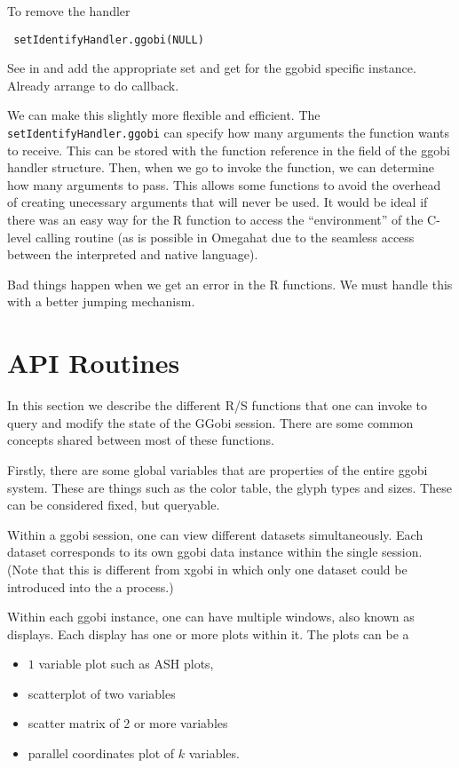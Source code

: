 \documentclass{article}
\def\SFunction#1{{\texttt{\red #1}}}
\begin{document}
To remove the handler
\begin{verbatim}
 setIdentifyHandler.ggobi(NULL)
\end{verbatim}

See  in  and add the appropriate
set and get for the ggobid specific instance.  Already arrange to do
callback.

We can make this slightly more flexible and efficient.  The
\SFunction{setIdentifyHandler.ggobi} can specify how many arguments
the function wants to receive.  This can be stored with the function
reference in the  field of the ggobi handler
structure. Then, when we go to invoke the function, we can determine
how many arguments to pass.  This allows some functions to avoid the
overhead of creating unecessary arguments that will never be used.  It
would be ideal if there was an easy way for the R function to access
the ``environment'' of the C-level calling routine (as is possible in
Omegahat due to the seamless access between the interpreted and native
language).


Bad things happen when we get an error in the R functions.  We must
handle this with a better jumping mechanism.


\section{API Routines}
In this section we describe the different R/S functions that one can
invoke to query and modify the state of the GGobi session.  There are
some common concepts shared between most of these functions.

Firstly, there are some global variables that are properties of the
entire ggobi system.  These are things such as the color table, the
glyph types and sizes.  These can be considered fixed, but queryable.

Within a ggobi session, one can view different datasets
simultaneously. Each dataset corresponds to its own ggobi data
instance within the single session.  (Note that this is different from
xgobi in which only one dataset could be introduced into the a
process.)

Within each ggobi instance, one can have multiple windows, also known
as displays.  Each display has one or more plots within it.  The plots
can be a
\begin{itemize}
\item $1$ variable plot
such as ASH plots,
\item  scatterplot of two variables
\item scatter matrix of 2 or more variables
\item parallel coordinates plot of $k$ variables.
\end{itemize}
\end{document}
